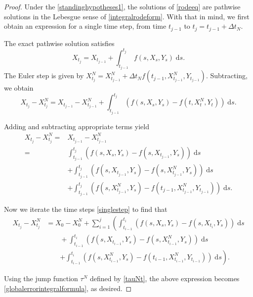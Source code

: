 \documentclass[reqno,12pt]{amsart}
\theoremstyle{plain} %
\theoremstyle{definition} %
\begin{document}
\begin{proof}
    Under the \cref{standinghypotheses1}, the solutions of \eqref{rodeeq} are pathwise solutions in the Lebesgue sense of \eqref{integralrodeform}. With that in mind, we first obtain an expression for a single time step, from time $t_{j-1}$ to $t_j = t_{j-1} + \Delta t_N$.
    
    The exact pathwise solution satisfies
    $$
    X_{t_j} = X_{t_{j-1}} + \int_{t_{j-1}}^{t_j} f(s, X_s, Y_s) \;\mathrm{d}s.
    $$
    The Euler step is given by $X_{t_j}^N = X_{t_{j-1}}^N + \Delta t_N f(t_{j-1}, X_{t_{j-1}}^N, Y_{t_{j-1}}).$ Subtracting, we obtain
    $$
    X_{t_j} - X_{t_j}^N = X_{t_{j-1}} - X_{t_{j-1}}^N + \int_{t_{j-1}}^{t_j} \left( f(s, X_s, Y_s) - f(t, X_t^N, Y_t) \right)\;\mathrm{d}s.
    $$

    Adding and subtracting appropriate terms yield
    \begin{equation}
        \label{singlestep}
        \begin{aligned}
            X_{t_j} - X_{t_j}^N  = & X_{t_{j-1}} - X_{t_{j-1}}^N \\
            = &  \int_{t_{j-1}}^{t_j} \left( f(s, X_s, Y_s) - f(s, X_{t_{j-1}}, Y_s) \right)\;\mathrm{d}s \\ 
            & + \int_{t_{j-1}}^{t_j} \left( f(s, X_{t_{j-1}}, Y_s) - f(s, X_{t_{j-1}}^N, Y_s) \right)\;\mathrm{d}s \\
            & + \int_{t_{j-1}}^{t_j} \left( f(s, X_{t_{j-1}}^N, Y_s) - f(t_{j-1}, X_{t_{j-1}}^N, Y_{t_{j-1}}) \right)\;\mathrm{d}s.
        \end{aligned}
    \end{equation}

    Now we iterate the time steps \eqref{singlestep} to find that
    \begin{align*}
        X_{t_j} - X_{t_j}^N & = X_0 - X_0^N + \sum_{i=1}^{j} \left(\int_{t_{i-1}}^{t_i} \left( f(s, X_s, Y_s) - f(s, X_{t_{i}}, Y_s) \right)\;\mathrm{d}s \right. \\ 
        & \qquad + \int_{t_{i-1}}^{t_i} \left( f(s, X_{t_{i-1}}, Y_s) - f(s, X_{t_{i-1}}^N, Y_s) \right)\;\mathrm{d}s \\
        & \qquad \left. + \int_{t_{i-1}}^{t_i} \left( f(s, X_{t_{i-1}}^N, Y_s) - f(t_{i-1}, X_{t_{i-1}}^N, Y_{t_{i-1}}) \right)\;\mathrm{d}s \right).
    \end{align*}

    Using the jump function $\tau^N$ defined by \eqref{tauNt}, the above expression becomes \eqref{globalerrorintegralformula}, as desired.
\end{proof}
\end{document}
